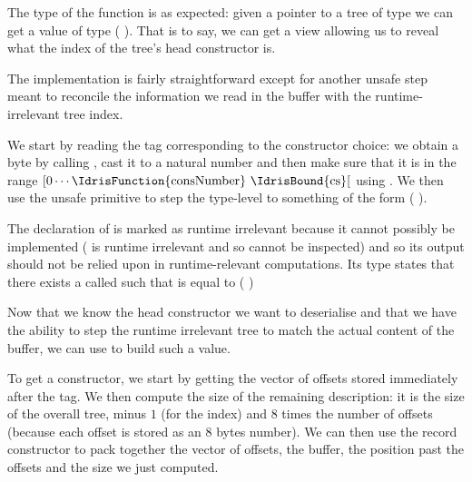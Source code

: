 
The type of the  function is as expected: given a pointer
to a tree  of type  we can get a value
of type (  ).
%
That is to say, we can get a view allowing us to reveal what the
index of the tree's head constructor is.


The implementation is fairly straightforward except for another
unsafe step meant to reconcile the information we read in the buffer
with the runtime-irrelevant tree index.


We start by reading the tag 
corresponding to the constructor choice:
we obtain a byte by calling , cast it to a
natural number and then make sure that it is in the range
$[0 \cdots \text{\IdrisFunction{consNumber} \IdrisBound{cs}}[$ using
.
%
We then use the unsafe  primitive to step the
type-level  to something of the form
( \IdrisData{\#} ).


The declaration of  is marked as runtime
irrelevant because it cannot possibly be implemented
( is runtime irrelevant and so cannot be inspected)
and so its output should not be relied upon in runtime-relevant
computations.
%
Its type states that there exists a  called
 such that  is equal to
( \IdrisData{\#} )

Now that we know the head constructor we want to deserialise and that
we have the ability to step the runtime irrelevant tree to match the
actual content of the buffer, we can use 
to build such a value.


To get a constructor, we start by getting the vector of offsets stored
immediately after the tag. We then compute the size of the remaining
 description: it is the size of the overall tree,
minus $1$ (for the index) and $8$ times the number of offsets (because
each offset is stored as an 8 bytes number).
%
We can then use the record constructor  to pack
together the vector of offsets, the buffer, the position past the offsets
and the size we just computed.

